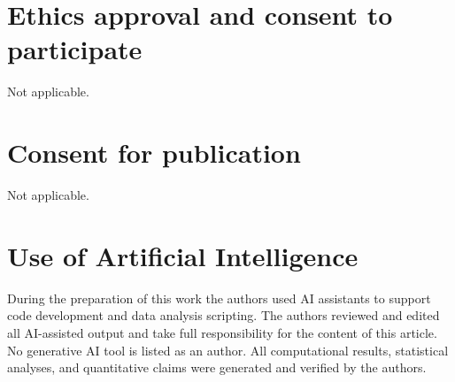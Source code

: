 \documentclass[10pt,a4paper]{article}
\begin{document}
\section*{Ethics approval and consent to participate}
Not applicable.

\section*{Consent for publication}
Not applicable.

\section*{Use of Artificial Intelligence}
During the preparation of this work the authors used AI assistants to support code development and data analysis scripting. The authors reviewed and edited all AI-assisted output and take full responsibility for the content of this article. No generative AI tool is listed as an author. All computational results, statistical analyses, and quantitative claims were generated and verified by the authors.



\end{document}
